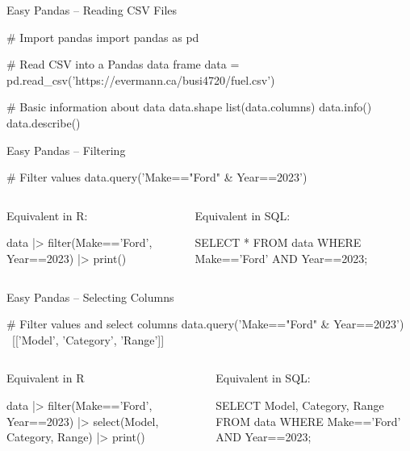\documentclass[ignorenonframetext,xcolor=x11names]{beamer}
\begin{document}
\begin{frame}[fragile]{Easy Pandas -- Reading CSV Files}
\begin{pythoncode}
# Import pandas 
import pandas as pd

# Read CSV into a Pandas data frame
data = pd.read_csv('https://evermann.ca/busi4720/fuel.csv')

# Basic information about data
data.shape
list(data.columns)
data.info()
data.describe()
\end{pythoncode}
\end{frame}

\begin{frame}[fragile]{Easy Pandas -- Filtering}
\begin{pythoncode}
# Filter values
data.query('Make=="Ford" & Year==2023')
\end{pythoncode}

\vspace{\baselineskip}
\begin{columns}
\begin{column}{.5\textwidth}
Equivalent in R:
\begin{Rcode}
data |> 
  filter(Make=='Ford', 
         Year==2023) |> 
  print()
\end{Rcode}
\end{column}
\begin{column}{.5\textwidth}
Equivalent in SQL:
\begin{sqlcode}
SELECT * 
   FROM data 
   WHERE Make=='Ford' AND 
         Year==2023;
\end{sqlcode}
\end{column}
\end{columns}
\end{frame}

\begin{frame}[fragile]{Easy Pandas -- Selecting Columns}

\begin{pythoncode}
# Filter values and select columns
data.query('Make=="Ford" & Year==2023') \
    [['Model', 'Category', 'Range']]
\end{pythoncode}

\vspace{\baselineskip}

\begin{columns}
\begin{column}{.5\textwidth}
Equivalent in R
\begin{Rcode}
data |> 
  filter(Make=='Ford', 
         Year==2023) |> 
  select(Model, Category, 
            Range) |>
  print()
\end{Rcode}
\end{column}
\begin{column}{.5\textwidth}
Equivalent in SQL:

\begin{sqlcode}
SELECT Model, Category, Range 
   FROM data 
   WHERE Make=='Ford' AND 
         Year==2023;
\end{sqlcode}
\end{column}
\end{columns}
\end{frame}
\end{document}

